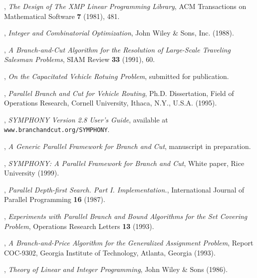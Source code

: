 \begin{thebibliography}{9}
,
{\em The Design of The XMP Linear Programming Library},
ACM Transactions on Mathematical Software {\bf 7} (1981), 481. 

, 
{\em Integer and Combinatorial Optimization},
John Wiley \& Sons, Inc. (1988).

, 
{\em A Branch-and-Cut Algorithm for the Resolution of Large-Scale
Traveling Salesman Problems},
SIAM Review {\bf 33} (1991), 60.

,
{\em On the Capacitated Vehicle Rotuing Problem},
submitted for publication.

, 
{\em Parallel Branch and Cut for Vehicle Routing},
Ph.D. Dissertation, Field of Operations Research,
Cornell University, Ithaca, N.Y., U.S.A. (1995).

,
{\em SYMPHONY Version 2.8 User's Guide}, available at 
{\tt www.branchandcut.org/SYMPHONY}.

,
{\em A Generic Parallel Framework for Branch and Cut},
manuscript in preparation.

,
{\em SYMPHONY: A Parallel Framework for Branch and Cut},
White paper, Rice University (1999).

, {\em Parallel Depth-first
Search. Part I. Implementation.}, International Journal of Parallel
Programming {\bf 16} (1987).

, {\em Experiments
with Parallel Branch and Bound Algorithms for the Set Covering
Problem}, Operations Research Letters {\bf 13} (1993).

, 
{\em A Branch-and-Price Algorithm for the Generalized
Assignment Problem},
Report COC-9302, Georgia Institute of Technology, Atlanta, Georgia
(1993).

, 
{\em Theory of Linear and Integer Programming},
John Wiley \& Sons (1986).

\end{thebibliography}

